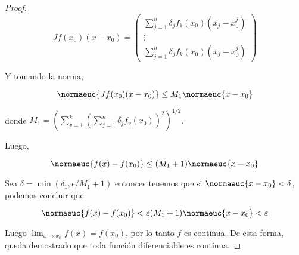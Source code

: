 \begin{proof}
    \[
    Jf(x_0)(x-x_0) =
    \begin{pmatrix}
        \sum_{j=1}^n \delta_j f_1 (x_0) (x_j - x_0^j) \\
        \vdots \\
        \sum_{j=1}^n \delta_j f_k (x_0) (x_j - x_0^j)
    \end{pmatrix}
    \]
    
    Y tomando la norma,
    
    \[
    \normaeuc{Jf(x_0)(x-x_0)} \leq M_1\normaeuc{x-x_0}
    \]
    
    \noindent donde $\displaystyle M_1 = \left( \sum_{v = 1}^k \left( \sum_{j=1}^n \delta_j f_v(x_0) \right)^2 \right)^{1/2}$.
    
    Luego,
    
    \[
    \normaeuc{f(x) - f(x_0)} \leq (M_1 + 1)\normaeuc{x - x_0}
    \]
    
    Sea $\delta = \min(\delta_1, \epsilon / M_1 + 1)$ entonces tenemos que si $\normaeuc{x - x_0} < \delta$, podemos concluir que
    
    \[
    \normaeuc{f(x) - f(x_0)} < \varepsilon(M_1 + 1)\normaeuc{x - x_0} < \varepsilon
    \]
    
    Luego $\lim_{x \to x_0} f(x) = f(x_0)$, por lo tanto $f$ es continua. De esta forma, queda demostrado que toda función diferenciable es continua.
\end{proof}
